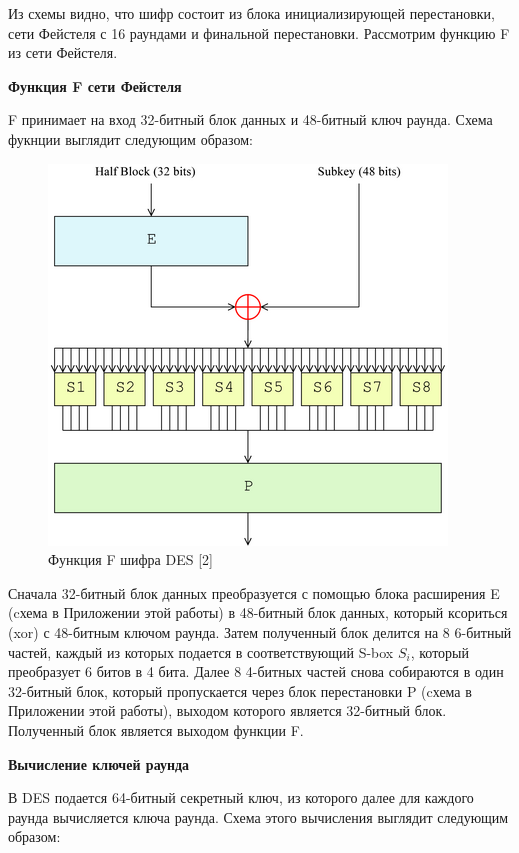 \documentclass[colorthm]{./civarticle}
\begin{document}
Из схемы видно, что шифр состоит из блока инициализирующей перестановки, сети Фейстеля с 16 раундами и финальной перестановки. Рассмотрим функцию F из сети Фейстеля.

\textbf{Функция F сети Фейстеля}

F принимает на вход 32-битный блок данных и 48-битный ключ раунда. Схема фукнции выглядит следующим образом: 

\begin{figure}[H]
    \centering
    \includegraphics[width=0.5\linewidth]{DES-f-function.png}
    \caption{Функция F шифра DES [2]}
    \label{fig:enter-label}
\end{figure}

Сначала 32-битный блок данных преобразуется с помощью блока расширения E (cхема в Приложении этой работы) в 48-битный блок данных, который ксориться (xor) с 48-битным ключом раунда. Затем полученный блок делится на 8 6-битный частей, каждый из которых подается в соответствующий S-box $S_i$, который преобразует 6 битов в 4 бита. Далее 8 4-битных частей снова собираются в один 32-битный блок, который пропускается через блок перестановки P (cхема в Приложении этой работы), выходом которого является 32-битный блок. Полученный блок является выходом функции F.

\textbf{Вычисление ключей раунда}

В DES подается 64-битный секретный ключ, из которого далее для каждого раунда вычисляется ключа раунда. Схема этого вычисления выглядит следующим образом:
\end{document}
